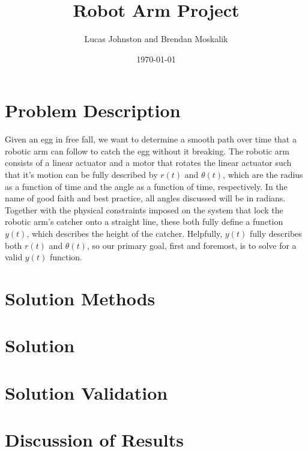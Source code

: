 \documentclass{article}
\title{Robot Arm Project}
\author{Lucas Johnston and Brendan Moskalik}
\date{\today}
\begin{document}
    \maketitle

    \section*{Problem Description}
    
    \tab Given an egg in free fall, we want to determine a smooth path over time that a robotic arm can follow to catch the egg without it breaking. The robotic arm consists of a linear actuator and a motor that rotates the linear actuator such that it's motion can be fully described by $r\left(t\right)$ and $\theta\left(t\right)$, which are the radius as a function of time and the angle as a function of time, respectively. In the name of good faith and best practice, all angles discussed will be in radians. Together with the physical constraints imposed on the system that lock the robotic arm's catcher onto a straight line, these both fully define a function $y\left(t\right)$, which describes the height of the catcher. Helpfully, $y\left(t\right)$ fully describes both $r\left(t\right)$ and $\theta\left(t\right)$, so our primary goal, first and foremost, is to solve for a valid $y\left(t\right)$ function.
     
	\section*{Solution Methods}
	
	\section*{Solution}
	
	\section*{Solution Validation}
	
	\section*{Discussion of Results}
	
\end{document}
